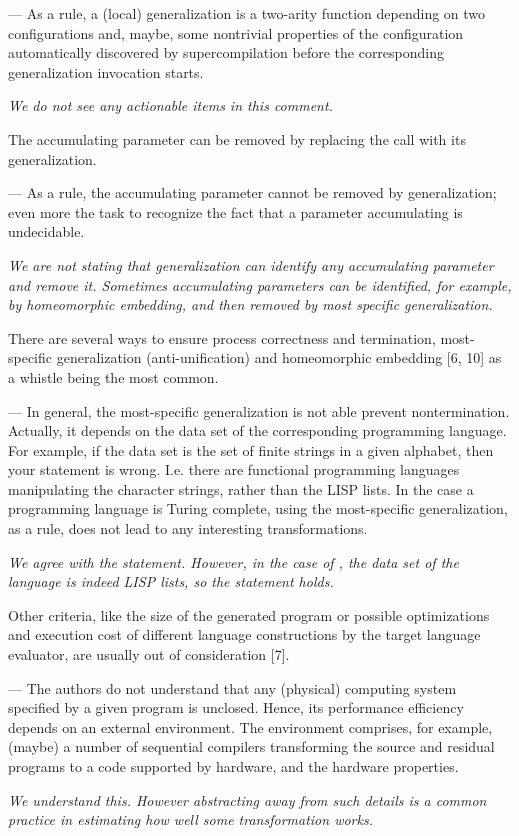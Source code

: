 \begin{enumerate}
{{      --- As a rule, a (local) generalization is a two-arity function depending on two configurations and, maybe, some nontrivial properties of the configuration automatically discovered by supercompilation before the corresponding generalization invocation starts.

      \emph{We do not see any actionable items in this comment.}
    }

    \item{
      The accumulating parameter can be removed by replacing the call with its generalization.

      --- As a rule, the accumulating parameter cannot be removed by generalization; even more the task to recognize the fact that a parameter accumulating is undecidable.

      \emph{We are not stating that generalization can identify any accumulating parameter and remove it. Sometimes accumulating parameters can be identified, for example, by homeomorphic embedding, and then removed by most specific generalization.}
    }

    \item{
      There are several ways to ensure process correctness and termination, most-specific generalization (anti-unification) and homeomorphic embedding [6, 10] as a whistle being the most common.

      --- In general, the most-specific generalization is not able prevent nontermination. Actually, it depends on the data set of the corresponding programming language. For example, if the data set is the set of finite strings in a given alphabet, then your statement is wrong. I.e. there are functional programming languages manipulating the character strings, rather than the LISP lists. In the case a programming language is Turing complete, using the most-specific generalization, as a rule, does not lead to any interesting transformations.

      \emph{We agree with the statement. However, in the case of \mk, the data set of the language is indeed LISP lists, so the statement holds. }
    }

    \item{Other criteria, like the size of the generated program or possible optimizations and execution cost of different language constructions by the target language evaluator, are usually out of consideration [7].

    --- The authors do not understand that any (physical) computing system specified by a given program is unclosed. Hence, its performance efficiency depends on an external environment. The environment comprises, for example, (maybe) a number of sequential compilers transforming the source and residual programs to a code supported by hardware, and the hardware properties.

    \emph{We understand this. However abstracting away from such details is a common practice in estimating how well some transformation works.}
    }

  }
\end{enumerate}

